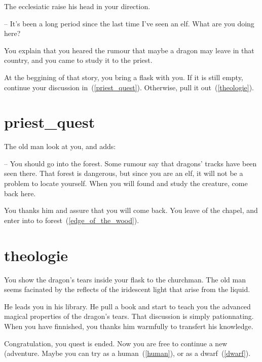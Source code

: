The ecclesiatic raise his head in your direction.

-- It's been a long period since the last time I've seen an elf. What are you
doing here?

You explain that you heared the rumour that maybe a dragon may leave in that
country, and you came to study it to the priest.

At the beggining of that story, you bring a flask with you. If it is still
empty, continue your discussion in~(\ref{priest_quest}). Otherwise, pull it
out~(\ref{theologie}).

\section{priest_quest}

The old man look at you, and adds:

-- You should go into the forest. Some rumour say that dragons' tracks have been
seen there. That forest is dangerous, but since you are an elf, it will not be a
problem to locate yourself. When you will found and study the creature, come
back here.

You thanks him and assure that you will come back. You leave of the chapel, and
enter into to forest~(\ref{edge_of_the_wood}).

\section{theologie}

You show the dragon's tears inside your flask to the churchman. The old man seems
facinated by the reflects of the iridescent light that arise from the liquid.

He leads you in his library. He pull a book and start to teach you the advanced
magical properties of the dragon's tears. That discussion is simply
pationnating. When you have finnished, you thanks him warmfully to transfert his
knowledge.

Congratulation, you quest is ended. Now you are free to continue a new
(adventure. Maybe you can try as a human~(\ref{human}), or as a dwarf~(\ref{dwarf}).
